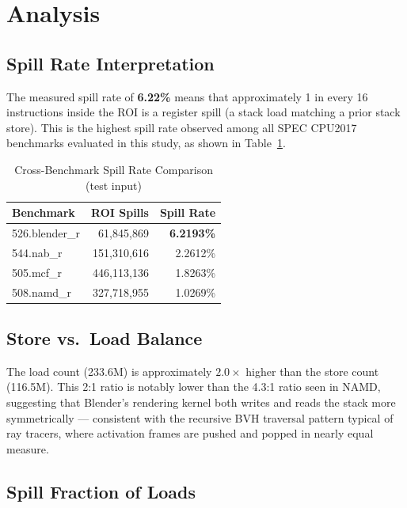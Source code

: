 \documentclass[conference]{IEEEtran}
\begin{document}
\section{Analysis}

\subsection{Spill Rate Interpretation}

The measured spill rate of \textbf{6.22\%} means that approximately
1 in every 16 instructions inside the ROI is a register spill
(a stack load matching a prior stack store). This is the highest
spill rate observed among all SPEC CPU2017 benchmarks evaluated
in this study, as shown in Table~\ref{tab:compare}.

\begin{table}[H]
\centering
\caption{Cross-Benchmark Spill Rate Comparison (test input)}
\label{tab:compare}
\begin{tabular}{lrr}
\toprule
\textbf{Benchmark} & \textbf{ROI Spills} & \textbf{Spill Rate} \\
\midrule
526.blender\_r & 61,845,869  & \textbf{6.2193\%} \\
544.nab\_r     & 151,310,616 & 2.2612\% \\
505.mcf\_r     & 446,113,136 & 1.8263\% \\
508.namd\_r    & 327,718,955 & 1.0269\% \\
\bottomrule
\end{tabular}
\end{table}

\subsection{Store vs.\ Load Balance}

The load count (233.6M) is approximately $2.0\times$ higher than the
store count (116.5M). This 2:1 ratio is notably lower than the 4.3:1
ratio seen in NAMD, suggesting that Blender's rendering kernel
both writes and reads the stack more symmetrically --- consistent
with the recursive BVH traversal pattern typical of ray tracers,
where activation frames are pushed and popped in nearly equal measure.

\subsection{Spill Fraction of Loads}
\end{document}
